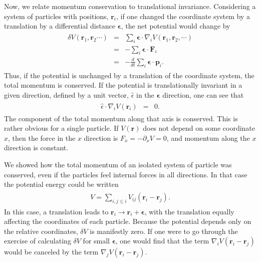 \documentclass[letterpaper,10pt,english]{sphinxmanual}
\begin{document}
Now, we relate momentum conservation to translational
invariance. Considering a system of particles with positions,
\(\boldsymbol{r}_i\), if one changed the coordinate system by a translation by a
differential distance \(\boldsymbol{\epsilon}\), the net potential would change
by
\begin{equation*}
\begin{split}
\begin{eqnarray}
\delta V(\boldsymbol{r}_1,\boldsymbol{r}_2\cdots)&=&\sum_i \boldsymbol{\epsilon}\cdot\nabla_i V(\boldsymbol{r}_1,\boldsymbol{r}_2,\cdots)\\
\nonumber
&=&-\sum_i \boldsymbol{\epsilon}\cdot\boldsymbol{F}_i\\
\nonumber
&=&-\frac{d}{dt}\sum_i \boldsymbol{\epsilon}\cdot\boldsymbol{p}_i.
\end{eqnarray}
\end{split}
\end{equation*}
Thus, if the potential is unchanged by a translation of the coordinate
system, the total momentum is conserved. If the potential is
translationally invariant in a given direction, defined by a unit
vector, \(\hat{\epsilon}\) in the \(\boldsymbol{\epsilon}\) direction, one can see
that
\begin{equation*}
\begin{split}
\begin{eqnarray}
\hat{\epsilon}\cdot\nabla_i V(\boldsymbol{r}_i)&=&0.
\end{eqnarray}
\end{split}
\end{equation*}
The component of the total momentum along that axis is conserved. This
is rather obvious for a single particle. If \(V(\boldsymbol{r})\) does not
depend on some coordinate \(x\), then the force in the \(x\) direction is
\(F_x=-\partial_xV=0\), and momentum along the \(x\) direction is
constant.

We showed how the total momentum of an isolated system of particle was conserved, even if the particles feel internal forces in all directions. In that case the potential energy could be written
\begin{equation*}
\begin{split}
\begin{eqnarray}
V=\sum_{i,j\le i}V_{ij}(\boldsymbol{r}_i-\boldsymbol{r}_j).
\end{eqnarray}
\end{split}
\end{equation*}
In this case, a translation leads to \(\boldsymbol{r}_i\rightarrow
\boldsymbol{r}_i+\boldsymbol{\epsilon}\), with the translation equally affecting the
coordinates of each particle. Because the potential depends only on
the relative coordinates, \(\delta V\) is manifestly zero. If one were
to go through the exercise of calculating \(\delta V\) for small
\(\boldsymbol{\epsilon}\), one would find that the term
\(\nabla_i V(\boldsymbol{r}_i-\boldsymbol{r}_j)\) would be canceled by the term
\(\nabla_jV(\boldsymbol{r}_i-\boldsymbol{r}_j)\).
\end{document}
